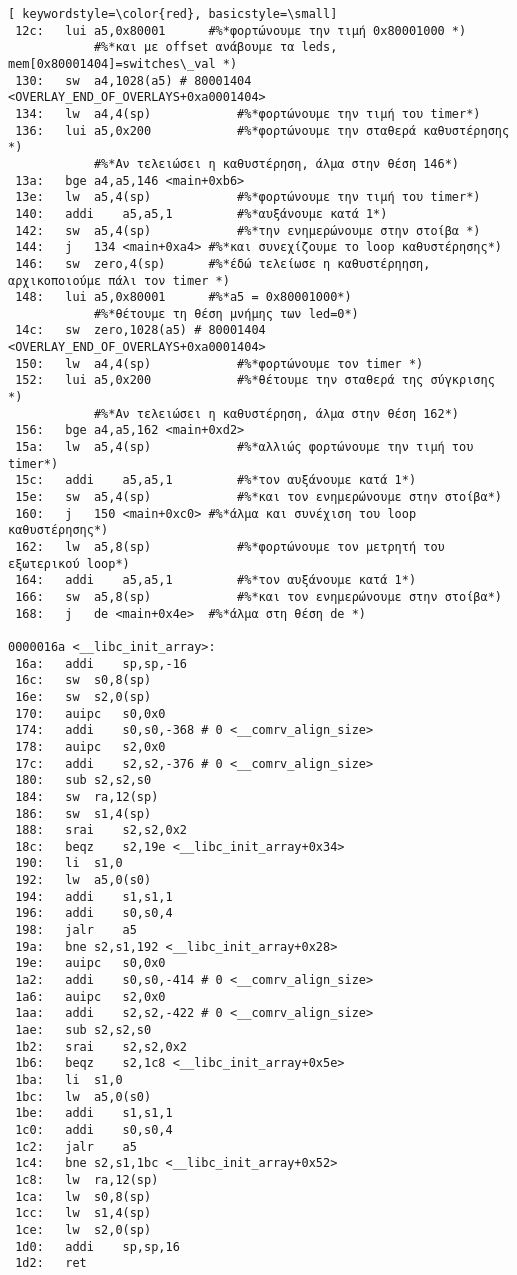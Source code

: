 \documentclass[a4paper]{article}
\begin{document}
\begin{lstlisting}[ keywordstyle=\color{red}, basicstyle=\small]
 12c:	lui	a5,0x80001		#%*φορτώνουμε την τιμή 0x80001000 *)	
			#%*και με offset ανάβουμε τα leds, mem[0x80001404]=switches\_val *)	
 130:	sw	a4,1028(a5) # 80001404 <OVERLAY_END_OF_OVERLAYS+0xa0001404>
 134:	lw	a4,4(sp)			#%*φορτώνουμε την τιμή του timer*)	
 136:	lui	a5,0x200			#%*φορτώνουμε την σταθερά καθυστέρησης *)	
			#%*Αν τελειώσει η καθυστέρηση, άλμα στην θέση 146*)	
 13a:	bge	a4,a5,146 <main+0xb6>
 13e:	lw	a5,4(sp)			#%*φορτώνουμε την τιμή του timer*)	
 140:	addi	a5,a5,1			#%*αυξάνουμε κατά 1*)	
 142:	sw	a5,4(sp)			#%*την ενημερώνουμε στην στοίβα *)	
 144:	j	134 <main+0xa4>	#%*και συνεχίζουμε το loop καθυστέρησης*)	
 146:	sw	zero,4(sp)		#%*έδώ τελείωσε η καθυστέρηηση, αρχικοποιούμε πάλι τον timer *)	
 148:	lui	a5,0x80001		#%*a5 = 0x80001000*)	
			#%*θέτουμε τη θέση μνήμης των led=0*)	
 14c:	sw	zero,1028(a5) # 80001404 <OVERLAY_END_OF_OVERLAYS+0xa0001404>
 150:	lw	a4,4(sp)			#%*φορτώνουμε τον timer *)	
 152:	lui	a5,0x200			#%*θέτουμε την σταθερά της σύγκρισης *)	
			#%*Αν τελειώσει η καθυστέρηση, άλμα στην θέση 162*)	
 156:	bge	a4,a5,162 <main+0xd2>
 15a:	lw	a5,4(sp)			#%*αλλιώς φορτώνουμε την τιμή του timer*)	
 15c:	addi	a5,a5,1			#%*τον αυξάνουμε κατά 1*)	
 15e:	sw	a5,4(sp)			#%*και τον ενημερώνουμε στην στοίβα*)	
 160:	j	150 <main+0xc0>	#%*άλμα και συνέχιση του loop καθυστέρησης*)	
 162:	lw	a5,8(sp)			#%*φορτώνουμε τον μετρητή του εξωτερικού loop*)	
 164:	addi	a5,a5,1			#%*τον αυξάνουμε κατά 1*)	
 166:	sw	a5,8(sp)			#%*και τον ενημερώνουμε στην στοίβα*)	
 168:	j	de <main+0x4e>	#%*άλμα στη θέση de *)	

0000016a <__libc_init_array>:
 16a:	addi	sp,sp,-16
 16c:	sw	s0,8(sp)
 16e:	sw	s2,0(sp)
 170:	auipc	s0,0x0
 174:	addi	s0,s0,-368 # 0 <__comrv_align_size>
 178:	auipc	s2,0x0
 17c:	addi	s2,s2,-376 # 0 <__comrv_align_size>
 180:	sub	s2,s2,s0
 184:	sw	ra,12(sp)
 186:	sw	s1,4(sp)
 188:	srai	s2,s2,0x2
 18c:	beqz	s2,19e <__libc_init_array+0x34>
 190:	li	s1,0
 192:	lw	a5,0(s0)
 194:	addi	s1,s1,1
 196:	addi	s0,s0,4
 198:	jalr	a5
 19a:	bne	s2,s1,192 <__libc_init_array+0x28>
 19e:	auipc	s0,0x0
 1a2:	addi	s0,s0,-414 # 0 <__comrv_align_size>
 1a6:	auipc	s2,0x0
 1aa:	addi	s2,s2,-422 # 0 <__comrv_align_size>
 1ae:	sub	s2,s2,s0
 1b2:	srai	s2,s2,0x2
 1b6:	beqz	s2,1c8 <__libc_init_array+0x5e>
 1ba:	li	s1,0
 1bc:	lw	a5,0(s0)
 1be:	addi	s1,s1,1
 1c0:	addi	s0,s0,4
 1c2:	jalr	a5
 1c4:	bne	s2,s1,1bc <__libc_init_array+0x52>
 1c8:	lw	ra,12(sp)
 1ca:	lw	s0,8(sp)
 1cc:	lw	s1,4(sp)
 1ce:	lw	s2,0(sp)
 1d0:	addi	sp,sp,16
 1d2:	ret

\end{lstlisting}
\end{document}
